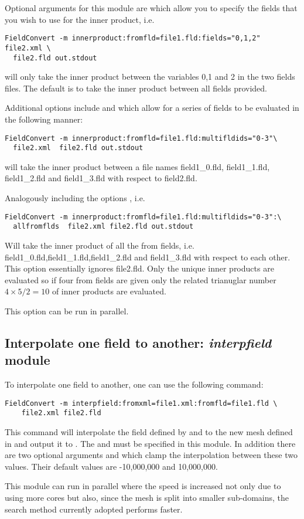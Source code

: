 Optional arguments for this module are  which allow you to specify
the fields that you wish to use for the inner product, i.e.
\begin{lstlisting}[style=BashInputStyle]
  FieldConvert -m innerproduct:fromfld=file1.fld:fields="0,1,2" file2.xml \
  file2.fld out.stdout
\end{lstlisting}
will only take the inner product between the variables 0,1 and 2 in
the two fields files. The default is to take the inner product between
all fields provided.

Additional options include  and 
which allow for a series of fields to be evaluated in the following
manner:
\begin{lstlisting}[style=BashInputStyle]
  FieldConvert -m innerproduct:fromfld=file1.fld:multifldids="0-3"\
  file2.xml  file2.fld out.stdout
\end{lstlisting}
will take the inner product between a file names
field1\_0.fld, field1\_1.fld, field1\_2.fld and field1\_3.fld with
respect to field2.fld.

Analogously including the options , i.e.
\begin{lstlisting}[style=BashInputStyle]
  FieldConvert -m innerproduct:fromfld=file1.fld:multifldids="0-3":\
  allfromflds  file2.xml file2.fld out.stdout
\end{lstlisting}
Will take the inner product of all the from fields,
i.e. field1\_0.fld,field1\_1.fld,field1\_2.fld and field1\_3.fld with
respect to each other. This option essentially ignores file2.fld. Only
the unique inner products are evaluated so if four from fields are
given only the related trianuglar number $4\times5/2=10$ of inner
products are evaluated.

This option can be run in parallel.

%
%
%

\subsection{Interpolate one field to another: \textit{interpfield} module}
To interpolate one field to another, one can use the following command:
%
\begin{lstlisting}[style=BashInputStyle]
FieldConvert -m interpfield:fromxml=file1.xml:fromfld=file1.fld \
	file2.xml file2.fld
\end{lstlisting}
%
This command will interpolate the field defined by 
and \inltt{file1.fld} to the new mesh defined in  and
output it to .
The  and  must be specified in this module.
In addition there are two optional arguments 
and \inltt{clamptouppervalue} which clamp the interpolation between
these two values. Their default values are -10,000,000 and 10,000,000.
%
\begin{tipbox}
This module can run in parallel where the speed is increased not
only due to using more cores but also, since the mesh is split into
smaller sub-domains, the search method currently adopted performs
faster.
\end{tipbox}
%
%
%

